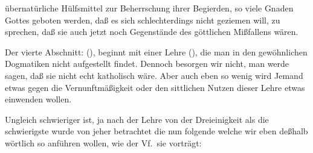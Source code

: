 übernatürliche Hülfsmittel zur Beherrschung ihrer Begierden, so viele Gnaden Gottes geboten werden, daß es sich schlechterdings nicht geziemen will, zu sprechen, daß sie auch jetzt noch Gegenstände des göttlichen Mißfallens wären. \par
\gliederungslinie\par
Der vierte Abschnitt:  (), beginnt mit einer Lehre  (),  die man in den gewöhnlichen Dogmatiken nicht aufgestellt findet. Dennoch besorgen wir nicht, man werde sagen, daß sie nicht echt katholisch wäre. Aber auch eben so wenig wird Jemand etwas gegen die Vernunftmäßigkeit oder den sittlichen Nutzen dieser Lehre etwas einwenden wollen. \par
Ungleich schwieriger ist, ja nach der Lehre von der Dreieinigkeit als die schwierigste wurde von jeher betrachtet die nun folgende  welche wir eben deßhalb wörtlich so anführen wollen, wie der Vf.\ sie  vorträgt: \par
